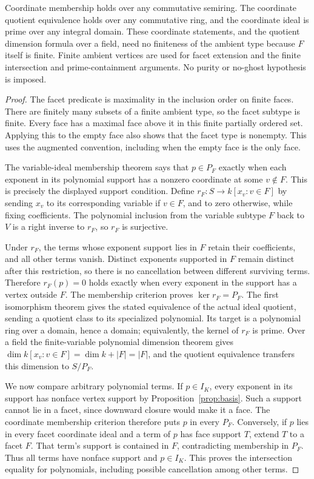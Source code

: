 \begin{proposition}
Coordinate membership holds over any commutative semiring. The coordinate
quotient equivalence holds over any commutative ring, and the coordinate
ideal is prime over any integral domain. These coordinate statements, and
the quotient dimension formula over a field, need no finiteness of the
ambient type because $F$ itself is finite. Finite ambient vertices are
used for facet extension and the finite intersection and prime-containment
arguments. No purity or no-ghost hypothesis is imposed.
\end{proposition}
\begin{proof}
\leanok
The facet predicate is maximality in the inclusion order on finite faces.
There are finitely many subsets of a finite ambient type, so the facet
subtype is finite. Every face has a maximal face above it in this finite
partially ordered set. Applying this to the empty face also shows that
the facet type is nonempty. This uses the augmented convention, including
when the empty face is the only face.

The variable-ideal membership theorem says that $p\in P_F$ exactly when
each exponent in its polynomial support has a nonzero coordinate at some
$v\notin F$. This is precisely the displayed support condition.
Define $r_F:S\to k[x_v:v\in F]$ by sending $x_v$ to its corresponding
variable if $v\in F$, and to zero otherwise, while fixing coefficients.
The polynomial inclusion from the variable subtype $F$ back to $V$ is a
right inverse to $r_F$, so $r_F$ is surjective.

Under $r_F$, the terms whose exponent support lies in $F$ retain their
coefficients, and all other terms vanish. Distinct exponents supported in
$F$ remain distinct after this restriction, so there is no cancellation
between different surviving terms. Therefore $r_F(p)=0$ holds exactly when
every exponent in the support has a vertex outside $F$. The membership
criterion proves $\ker r_F=P_F$. The first isomorphism theorem gives the
stated equivalence of the actual ideal quotient, sending a quotient class
to its specialized polynomial. Its target is a polynomial ring over a
domain, hence a domain; equivalently, the kernel of $r_F$ is prime. Over
a field the finite-variable polynomial dimension theorem gives
$\dim k[x_v:v\in F]=\dim k+|F|=|F|$, and the quotient equivalence transfers
this dimension to $S/P_F$.

We now compare arbitrary polynomial terms. If $p\in I_K$, every exponent
in its support has nonface vertex support by Proposition~\ref{prop:basis}.
Such a support cannot lie in a facet, since downward closure would make
it a face. The coordinate membership criterion therefore puts $p$ in
every $P_F$. Conversely, if $p$ lies in every facet coordinate ideal and
a term of $p$ has face support $T$, extend $T$ to a facet $F$. That term's
support is contained in $F$, contradicting membership in $P_F$. Thus all
terms have nonface support and $p\in I_K$. This proves the intersection
equality for polynomials, including possible cancellation among other terms.


\end{proof}
